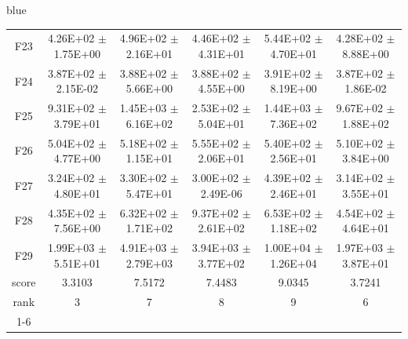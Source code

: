 \documentclass[journal, onecolumn]{IEEEtran}
\begin{document}
\begin{color}{blue}
\begin{table}[htbp!]
\begin{tabular}{c|ccccc}
		F23	 &	4.26E+02	$\pm$	1.75E+00		 &	4.96E+02	$\pm$	2.16E+01		 &	4.46E+02	$\pm$	4.31E+01		 &	5.44E+02	$\pm$	4.70E+01		 &	4.28E+02	$\pm$	8.88E+00	\\
		F24	 &	3.87E+02	$\pm$	2.15E-02		 &	3.88E+02	$\pm$	5.66E+00		 &	3.88E+02	$\pm$	4.55E+00		 &	3.91E+02	$\pm$	8.19E+00		 &	3.87E+02	$\pm$	1.86E-02	\\
		F25	 &	9.31E+02	$\pm$	3.79E+01		 &	1.45E+03	$\pm$	6.16E+02		 &	2.53E+02	$\pm$	5.04E+01		 &	1.44E+03	$\pm$	7.36E+02		 &	9.67E+02	$\pm$	1.88E+02	\\
		F26	 &	5.04E+02	$\pm$	4.77E+00		 &	5.18E+02	$\pm$	1.15E+01		 &	5.55E+02	$\pm$	2.06E+01		 &	5.40E+02	$\pm$	2.56E+01		 &	5.10E+02	$\pm$	3.84E+00	\\
		F27	 &	3.24E+02	$\pm$	4.80E+01		 &	3.30E+02	$\pm$	5.47E+01		 &	3.00E+02	$\pm$	2.49E-06		 &	4.39E+02	$\pm$	2.46E+01		 &	3.14E+02	$\pm$	3.55E+01	\\
		F28	 &	4.35E+02	$\pm$	7.56E+00		 &	6.32E+02	$\pm$	1.71E+02		 &	9.37E+02	$\pm$	2.61E+02		 &	6.53E+02	$\pm$	1.18E+02		 &	4.54E+02	$\pm$	4.64E+01	\\
		F29	 &	1.99E+03	$\pm$	5.51E+01		 &	4.91E+03	$\pm$	2.79E+03		 &	3.94E+03	$\pm$	3.77E+02		 &	1.00E+04	$\pm$	1.26E+04		 &	1.97E+03	$\pm$	3.87E+01	\\\hline
		score	 	 & 3.3103 & 7.5172 & 7.4483 & 9.0345 & 3.7241											\\					
		rank 		& 3 & 7 & 8 & 9 & 6											\\	\cline{1-6}											
								
	\end{tabular}
\end{table}


\end{color}
\end{document}
